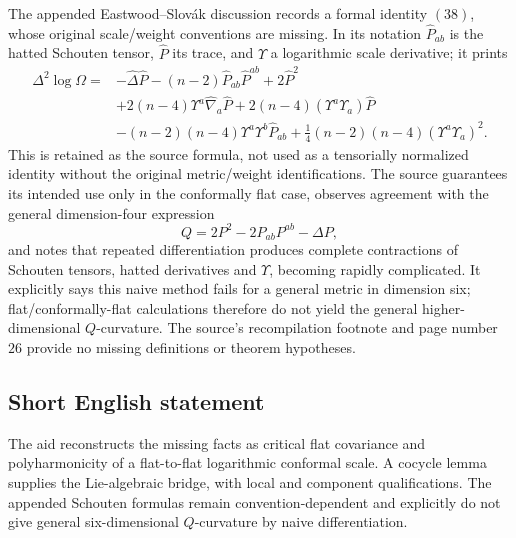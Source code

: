 \documentclass[11pt]{article}
\begin{document}
The appended Eastwood--Slov\'ak discussion records a formal identity \((38)\), whose original scale/weight conventions are missing. In its notation \(\widehat P_{ab}\) is the hatted Schouten tensor, \(\widehat P\) its trace, and \(\Upsilon\) a logarithmic scale derivative; it prints
\[
 \begin{split}
 \Delta^2\log\Omega={}&-\widehat\Delta\widehat P
 -(n-2)\widehat P_{ab}\widehat P^{ab}+2\widehat P^2\\
 &+2(n-4)\Upsilon^a\widehat\nabla_a\widehat P
 +2(n-4)(\Upsilon^a\Upsilon_a)\widehat P\\
 &-(n-2)(n-4)\Upsilon^a\Upsilon^b\widehat P_{ab}
 +\tfrac14(n-2)(n-4)(\Upsilon^a\Upsilon_a)^2.
 \end{split}
\]
This is retained as the source formula, not used as a tensorially normalized identity without the original metric/weight identifications. The source guarantees its intended use only in the conformally flat case, observes agreement with the general dimension-four expression
\[
 Q=2P^2-2P_{ab}P^{ab}-\Delta P,
\]
and notes that repeated differentiation produces complete contractions of Schouten tensors, hatted derivatives and \(\Upsilon\), becoming rapidly complicated. It explicitly says this naive method fails for a general metric in dimension six; flat/conformally-flat calculations therefore do not yield the general higher-dimensional \(Q\)-curvature. The source's recompilation footnote and page number \(26\) provide no missing definitions or theorem hypotheses.
\subsection{Short English statement}
The aid reconstructs the missing facts as critical flat covariance and polyharmonicity of a flat-to-flat logarithmic conformal scale. A cocycle lemma supplies the Lie-algebraic bridge, with local and component qualifications. The appended Schouten formulas remain convention-dependent and explicitly do not give general six-dimensional \(Q\)-curvature by naive differentiation.
\end{document}
